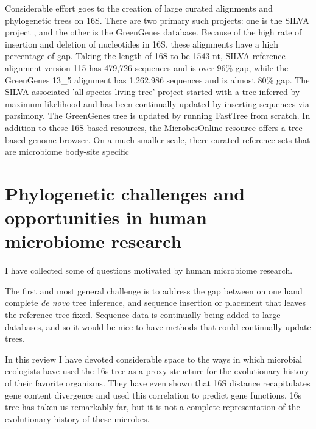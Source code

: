 \documentclass{amsart}
\begin{document}
Considerable effort goes to the creation of large curated alignments and phylogenetic trees on 16S.
There are two primary such projects: one is the SILVA project \citep{pruesse2007silva,quast2013silva}, and the other is the GreenGenes \citep{desantis2006greengenes,mcdonald2011improved} database.
Because of the high rate of insertion and deletion of nucleotides in 16S, these alignments have a high percentage of gap.
Taking the length of 16S to be 1543 nt,
SILVA reference alignment version 115 has 479,726 sequences and is over 96\% gap,
while the GreenGenes 13\_5 alignment has 1,262,986 sequences and is almost 80\% gap.
The SILVA-associated 'all-species living tree' project \cite{yarza2008all} started with a tree inferred by maximum likelihood and has been continually updated  by inserting sequences via parsimony.
The GreenGenes tree is updated by running FastTree from scratch.
In addition to these 16S-based resources, the MicrobesOnline resource \citep{dehal2010microbesonline} offers a tree-based genome browser.
On a much smaller scale, there curated reference sets that are microbiome body-site specific \citep{chen2010human,griffen2011core,srinivasan2012bacterial}



\section{Phylogenetic challenges and opportunities in human microbiome research}

I have collected some of questions motivated by human microbiome research.

The first and most general challenge is to address the gap between on one hand complete \emph{de novo} tree inference, and sequence insertion or placement that leaves the reference tree fixed.
Sequence data is continually being added to large databases, and so it would be nice to have methods that could continually update trees.

In this review I have devoted considerable space to the ways in which microbial ecologists have used the 16s tree as a proxy structure for the evolutionary history of their favorite organisms.
They have even shown that 16S distance recapitulates gene content divergence and used this correlation to predict gene functions.
16s tree has taken us remarkably far, but it is not a complete representation of the evolutionary history of these microbes.
\end{document}
